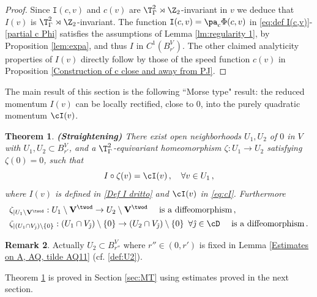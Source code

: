 \documentclass[11pt,a4paper,reqno]{article}
\numberwithin{equation}{section}
\newtheorem{theorem}{Theorem}[section]
\theoremstyle{definition}
\newtheorem{remark}[theorem]{Remark}
\begin{document}
\begin{proof}
Since ${\mathtt I}(c,v)$ and  $c(v)$ are $\T^2_\Gamma\rtimes \Z_2$-invariant in $v$ we deduce that $I(v)$ is $\T^2_\Gamma\rtimes \Z_2$-invariant.
The  function ${\mathtt I} (c,v) =
\pa_c \Phi(c,v) $ in \eqref{eq:def I(c,v)}-\eqref{partial c Phi} satisfies the assumptions of Lemma \ref{lm:regularity 1},  by 
Proposition \ref{lem:expa}, and thus  
$ I $ in $ C^1 
(B_{r'}^V ) $. The other claimed analyticity properties of $ I(v) $ directly follow
by those of the speed function  $ c(v) $ in Proposition \ref{Construction of c close and away from PJ}.
\end{proof}

The main result of this section is 
    the following ``Morse type"  result:  the reduced
    momentum  $ I(v) $ can be locally
    rectified, close to $ 0 $, 
   into the  purely quadratic momentum $ \cI (v) $.  
    \begin{theorem}\label{th:Moser's trick} {\bf (Straightening)}
        There exist open neighborhoods
        $ U_1, U_2  $ of $0$ in $ V $ with $ U_1, U_2 \subset B_{r'}^V $, and a $\T^2_\Gamma$-equivariant homeomorphism $\zeta:U_1\to U_2$
        satisfying  $ \zeta(0)=0 $, such that 
    \begin{equation}\label{Izeta}
    I\circ \zeta(v)=\cI(v) \, , \quad  \forall 
    v\in U_1 \, ,
    \end{equation}
where $I (v) $ is defined in \eqref{Def I dritto} and $ \cI (v) $ in \eqref{eq:cI}.  
    Furthermore 
    \begin{align}\label{diffeoint}
    & \zeta_{|U_1\setminus 
            {\bf V}^{\twod}}:U_1\setminus 
            {\bf V}^{\twod} \to U_2\setminus 
            {\bf V}^{\twod} \quad \text{ is a diffeomorphism}\, , \\
    & \label{diffeobordo}
    \zeta_{|(U_1\cap V_{\hat \jmath})\setminus\{0\}}:(U_1\cap V_{\hat \jmath})\setminus\{0\}\to (U_2\cap V_{\hat \jmath})\setminus\{0\} \, \ 
    \forall {\hat \jmath} \in \cD  \quad \text{ is a diffeomorphism}\, .
    \end{align}
    \end{theorem}

    \begin{remark}\label{rmk:U2 subset Br''}
        Actually $U_2\subset B_{r''}^V$ where $r''\in (0,r')$ is fixed in Lemma \ref{Estimates on A, AQ, tilde AQ11} (cf. \eqref{def:U2}).
    \end{remark}
    
    Theorem \ref{th:Moser's trick} is proved in Section \ref{sec:MT}
    using estimates proved in the 
    next section.
   
\end{document}
